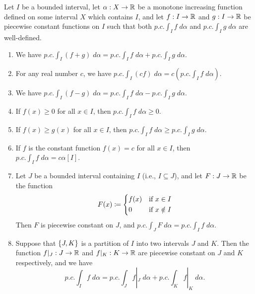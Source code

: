 \begin{ac}\label{i:ac:11.8.7}
  Let \(I\) be a bounded interval, let \(\alpha : X \to \mathbb{R}\) be a monotone increasing function defined on some interval \(X\) which contains \(I\), and let \(f : I \to \mathbb{R}\) and \(g : I \to \mathbb{R}\) be piecewise constant functions on \(I\) such that both \(p.c. \int_I f \; d \alpha\) and \(p.c. \int_I g \; d \alpha\) are well-defined.
  \begin{enumerate}
    \item\label{i:ac:11.8.7.a} We have \(p.c. \int_I (f + g) \; d \alpha = p.c. \int_I f \; d \alpha + p.c. \int_I g \; d \alpha\).
    \item\label{i:ac:11.8.7.b} For any real number \(c\), we have \(p.c. \int_I (cf) \; d \alpha = c (p.c. \int_I f \; d \alpha)\).
    \item\label{i:ac:11.8.7.c} We have \(p.c. \int_I (f - g) \; d \alpha = p.c. \int_I f \; d \alpha - p.c. \int_I g \; d \alpha\).
    \item\label{i:ac:11.8.7.d} If \(f(x) \geq 0\) for all \(x \in I\), then \(p.c. \int_I f \; d \alpha \geq 0\).
    \item\label{i:ac:11.8.7.e} If \(f(x) \geq g(x)\) for all \(x \in I\), then \(p.c. \int_I f \; d \alpha \geq p.c. \int_I g \; d \alpha\).
    \item\label{i:ac:11.8.7.f} If \(f\) is the constant function \(f(x) = c\) for all \(x \in I\), then \(p.c. \int_I f \; d \alpha = c \alpha[I]\).
    \item\label{i:ac:11.8.7.g} Let \(J\) be a bounded interval containing \(I\) (i.e., \(I \subseteq J\)), and let \(F : J \to \mathbb{R}\) be the function
    \[
      F(x) \coloneqq \begin{dcases}
        f(x) & \text{if } x \in I    \\
        0    & \text{if } x \notin I
      \end{dcases}
    \]
    Then \(F\) is piecewise constant on \(J\), and \(p.c. \int_J F \; d \alpha = p.c. \int_I f \; d \alpha\).
    \item\label{i:ac:11.8.7.h} Suppose that \(\left\lbrace J, K\right\rbrace\) is a partition of \(I\) into two intervals \(J\) and \(K\).
    Then the function \(f|_J : J \to \mathbb{R}\) and \(f|_K : K \to \mathbb{R}\) are piecewise constant on \(J\) and \(K\) respectively, and we have
    \[
      p.c. \int_I f \; d \alpha = p.c. \int_J f|_J \; d \alpha + p.c. \int_K f|_K \; d \alpha.
    \]
  \end{enumerate}
\end{ac}

